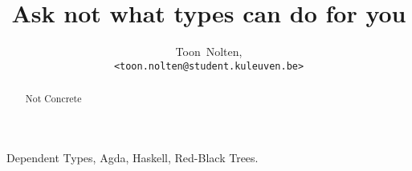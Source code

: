 \documentclass[journal, retainorgcmds]{../IEEEtemplate/IEEEtran}
\begin{document}
\title{Ask not what types can do for you}
\author{Toon~Nolten,\\ \texttt{<toon.nolten@student.kuleuven.be>}}%
\maketitle


\begin{abstract}
  Not Concrete
\end{abstract}

\begin{IEEEkeywords}
  Dependent Types, Agda, Haskell, Red-Black Trees.
\end{IEEEkeywords}


\end{document}
